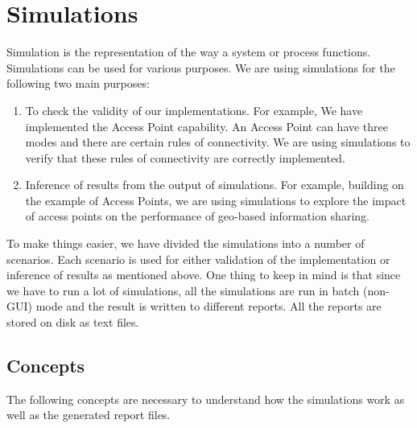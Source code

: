 \chapter{Simulations}\label{chapter:simulations}

Simulation is the representation of the way a system or process functions. Simulations can be used for various purposes. We are using simulations for the following two main purposes:

\begin{enumerate}
 \item To check the validity of our implementations. For example, We have implemented the Access Point capability. An Access Point can have three modes and there are certain rules of connectivity. We are using simulations to verify that these rules of connectivity are correctly implemented.
 \item Inference of results from the output of simulations. For example, building on the example of Access Points, we are using simulations to explore the impact of access points on the performance of geo-based information sharing.
\end{enumerate}

To make things easier, we have divided the simulations into a number of scenarios. Each scenario is used for either validation of the implementation or inference of results as mentioned above. One thing to keep in mind is that since we have to run a lot of simulations, all the simulations are run in batch (non-GUI) mode and the result is written to different reports. All the reports are stored on disk as text files.

\section{Concepts}
The following concepts are necessary to understand how the simulations work as well as the generated report files.


